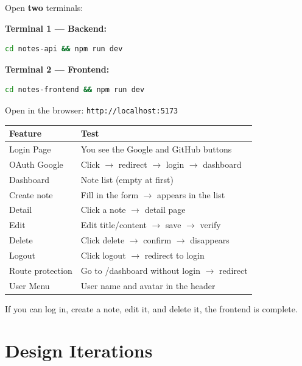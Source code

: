 \begin{praticabox}[title={Hands-On --- Start-up}]
Open \textbf{two} terminals:

\textbf{Terminal 1 --- Backend:}
\begin{lstlisting}[language=bash]
cd notes-api && npm run dev
\end{lstlisting}

\textbf{Terminal 2 --- Frontend:}
\begin{lstlisting}[language=bash]
cd notes-frontend && npm run dev
\end{lstlisting}

Open in the browser: \texttt{http://localhost:5173}
\end{praticabox}

\begin{center}
\begin{tabularx}{\textwidth}{l X}
\toprule
\textbf{Feature} & \textbf{Test} \\
\midrule
Login Page & You see the Google and GitHub buttons \\
OAuth Google & Click $\rightarrow$ redirect $\rightarrow$ login $\rightarrow$ dashboard \\
Dashboard & Note list (empty at first) \\
Create note & Fill in the form $\rightarrow$ appears in the list \\
Detail & Click a note $\rightarrow$ detail page \\
Edit & Edit title/content $\rightarrow$ save $\rightarrow$ verify \\
Delete & Click delete $\rightarrow$ confirm $\rightarrow$ disappears \\
Logout & Click logout $\rightarrow$ redirect to login \\
Route protection & Go to /dashboard without login $\rightarrow$ redirect \\
User Menu & User name and avatar in the header \\
\bottomrule
\end{tabularx}
\end{center}

\begin{checkpointbox}
If you can log in, create a note, edit it, and delete it, the frontend is complete.
\end{checkpointbox}

\section{Design Iterations}

